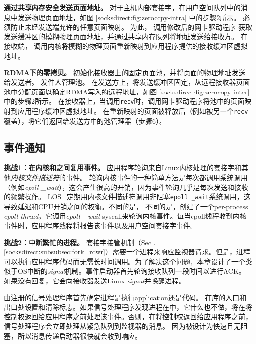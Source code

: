 \textbf {通过共享内存安全发送页面地址。}
对于主机内部套接字，在用户空间队列中的消息中发送物理页面地址，如图 \ref {socksdirect:fig:zerocopy-intra} 中的步骤2所示。
\sys{} 必须防止未经发送端允许的任意页面映射。
为此，\libipc {} 调用修改后的网卡驱动程序
获取发送缓冲区的模糊物理页面地址，并通过共享内存队列将地址发送给接收方。
在接收端，\libipc {} 调用内核将模糊的物理页面重新映射到应用程序提供的接收缓冲区虚拟地址。

\textbf {RDMA下的零拷贝。}
\libipc {}初始化接收器上的固定页面池，并将页面的物理地址发送给发送者。
发件人管理池。
在发送方上，\libipc {}将发送缓冲区固定，从远程接收器页面池中分配页面以确定RDMA写入的远程地址，如图 \ref {socksdirect:fig:zerocopy-inter}中的步骤2所示。
在接收器上，当调用\texttt {recv}时，\libipc 调用网卡驱动程序将池中的页面映射到应用程序缓冲区虚拟地址。
在重新映射的页面被释放后（例如被另一个\texttt {recv}覆盖），\libipc {}将它们返回给发送方中的池管理器（步骤6）。



\subsection{事件通知}
\label{socksdirect:subsec:process-mux}

\textbf {挑战1：在内核和\libipc {}之间复用事件。}
应用程序轮询来自Linux内核处理的套接字和其他\textit {内核文件描述符}的事件。
轮询内核事件的一种简单方法是每次都调用系统调用（例如\textit {epoll \_wait}），这会产生很高的开销，因为事件轮询几乎是每次发送和接收的频繁操作。
LOS~ \cite {huang2017high}定期用内核文件描述符调用非阻塞\texttt {epoll \_wait}系统调用，这导致延迟和CPU开销之间的权衡。不同的是，
不同的是，\libipc {}创建了一个per-process \textit {epoll thread}，它调用\textit {epoll \_wait} syscall来轮询内核事件。每当epoll线程收到内核事件时，应用程序线程将报告该事件以及用户空间套接字事件。

\textbf {挑战2：中断繁忙的进程。}
套接字接管机制（Sec .~ \ref {socksdirect:subsubsec:fork_rdwr}）需要一个进程来响应监视器请求。但是，进程可以执行应用程序代码而无需长时间调用\libipc {}。为了解决这个问题，本章设计了一个类似于OS中断的\textit {signal}机制。事件启动器首先轮询接收队列一段时间以进行ACK。如果没有回复，它会向接收器发送Linux \textit {signal}并唤醒进程。

由\libipc {}注册的信号处理程序首先确定进程是执行application还是\libipc {}代码。 \libipc {}在库的入口和出口处设置和清除标志。如果信号处理程序发现进程在\libipc 中，它什么也不做，\libipc {}将在将控制权返回给应用程序之前处理该事件。否则，在将控制权返回给应用程序之前，信号处理程序会立即处理从紧急队列到监视器的消息。
因为\libipc {}被设计为快速且无阻塞，所以消息传递启动器很快就会收到响应。

